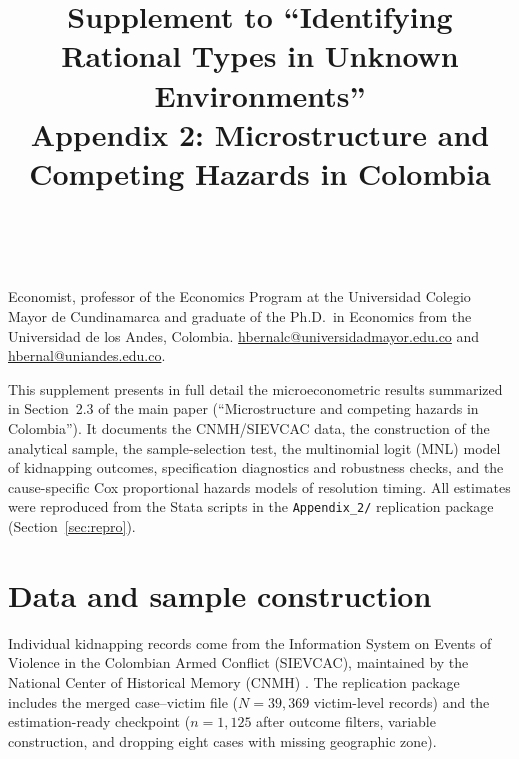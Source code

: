 \documentclass[ecta,nameyear,final,supplement]{econsocart}
\numberwithin{equation}{section}
\numberwithin{table}{section}
\begin{document}
\begin{frontmatter}

\title{Supplement to ``Identifying Rational Types in Unknown Environments''\\
Appendix 2: Microstructure and Competing Hazards in Colombia}

\begin{aug}
\author[add1,add2]{~}
\address[add1]{%
,
}
\address[add2]{%
,
}
\end{aug}

\begin{funding}
Economist, professor of the Economics Program at the Universidad Colegio
Mayor de Cundinamarca and graduate of the Ph.D.\ in Economics from the
Universidad de los Andes, Colombia.
\href{mailto:hbernalc@universidadmayor.edu.co}{hbernalc@universidadmayor.edu.co}
and \href{mailto:hbernal@uniandes.edu.co}{hbernal@uniandes.edu.co}.
\end{funding}

\end{frontmatter}

\noindent
This supplement presents in full detail the microeconometric results
summarized in Section~2.3 of the main paper (``Microstructure and competing
hazards in Colombia''). It documents the CNMH/SIEVCAC data, the construction
of the analytical sample, the sample-selection test, the multinomial logit
(MNL) model of kidnapping outcomes, specification diagnostics and robustness
checks, and the cause-specific Cox proportional hazards models of resolution
timing. All estimates were reproduced from the Stata scripts in the
\texttt{Appendix\_2/} replication package (Section~\ref{sec:repro}).

\section{Data and sample construction}
\label{sec:data}

Individual kidnapping records come from the Information System on Events of
Violence in the Colombian Armed Conflict (SIEVCAC), maintained by the
National Center of Historical Memory (CNMH) \citep{cnmh_datos,CNMH2013}.
The replication package includes the merged case--victim file
 ($N=39{,}369$ victim-level records) and the
estimation-ready checkpoint  ($n=1{,}125$
after outcome filters, variable construction, and dropping eight cases with
missing geographic zone).
\end{document}
